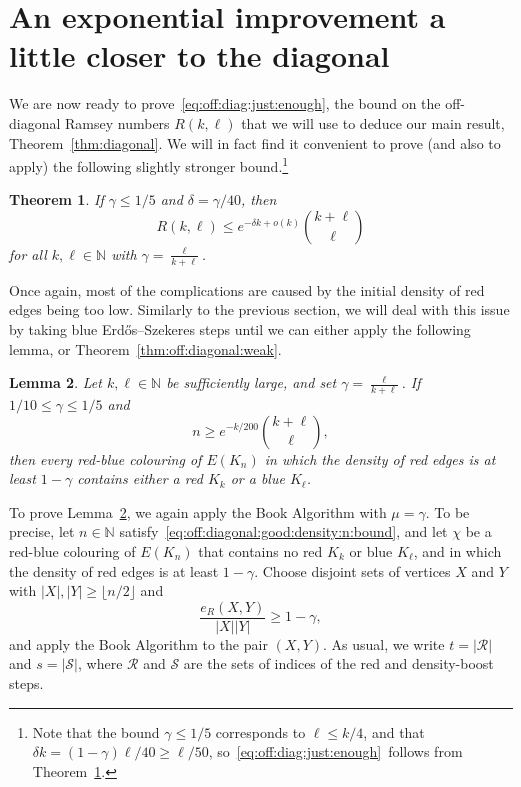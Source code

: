 \documentclass[12pt,reqno]{amsart}
\newtheorem{theorem}{Theorem}[section]
\newtheorem{lemma}[theorem]{Lemma}
\theoremstyle{definition}
\theoremstyle{remark}
\newcommand\N{\mathbb{N}}
\def\cS{\mathcal{S}}
\renewcommand{\le}{\leqslant}
\renewcommand{\ge}{\geqslant}
\def\N{\mathbb{N}}
\def\cR{\mathcal{R}}
\begin{document}
\pagebreak

\section{An exponential improvement a little closer to the diagonal}\label{just:enough:sec}

We are now ready to prove~\eqref{eq:off:diag:just:enough}, the bound on the off-diagonal Ramsey numbers $R(k,\ell)$ that we will use to deduce our main result, Theorem~\ref{thm:diagonal}. We will in fact find it convenient to prove (and also to apply) the following slightly stronger bound.\footnote{Note that the bound $\gamma \le 1/5$ corresponds to $\ell \le k/4$, and that $\delta k = (1-\gamma)\ell/40 \ge \ell / 50$, so~\eqref{eq:off:diag:just:enough}~follows from Theorem~\ref{thm:off:diagonal:gamma}.}

\begin{theorem}\label{thm:off:diagonal:gamma}
If $\gamma \le 1/5$ and $\delta = \gamma/40$, then 
$$R(k,\ell) \le e^{-\delta k + o(k)} {k + \ell \choose \ell}$$
for all $k,\ell \in \N$ with $\gamma = \frac{\ell}{k+\ell}$. 
\end{theorem}

Once again, most of the complications are caused by the initial density of red edges being too low. Similarly to the previous section, we will deal with this issue by taking blue Erd\H{o}s--Szekeres steps until we can either apply the following lemma, or Theorem~\ref{thm:off:diagonal:weak}. 

\begin{lemma}\label{lem:off:diagonal:good:density}
Let $k,\ell \in \N$ be sufficiently large, and set $\gamma = \frac{\ell}{k+\ell}$. If\/ $1/10 \le \gamma \le 1/5$ and 
\begin{equation}\label{eq:off:diagonal:good:density:n:bound}
n \ge e^{-k/200} {k + \ell \choose \ell},
\end{equation}
then every red-blue colouring of $E(K_n)$ in which the density of red edges is at least $1 - \gamma$ contains either a red $K_k$ or a blue $K_\ell$. 
\end{lemma}

To prove Lemma~\ref{lem:off:diagonal:good:density}, we again apply the Book Algorithm with $\mu = \gamma$. To be precise, let $n \in \N$ satisfy~\eqref{eq:off:diagonal:good:density:n:bound}, and let $\chi$ be a red-blue colouring of $E(K_n)$ that contains no red $K_k$ or blue $K_\ell$, and in which the density of red edges is at least $1 - \gamma$. Choose disjoint sets of vertices $X$ and $Y$ with $|X|,|Y| \ge \lfloor n/2 \rfloor$ and 
\begin{equation}\label{off:diag:good:start:density}
\frac{e_R(X,Y)}{|X||Y|} \ge 1 - \gamma,
\end{equation}
and apply the Book Algorithm to the pair $(X,Y)$. As usual, we write $t = |\cR|$ and $s = |\cS|$, where $\cR$ and $\cS$ are the sets of indices of the red and density-boost steps. 
\end{document}

